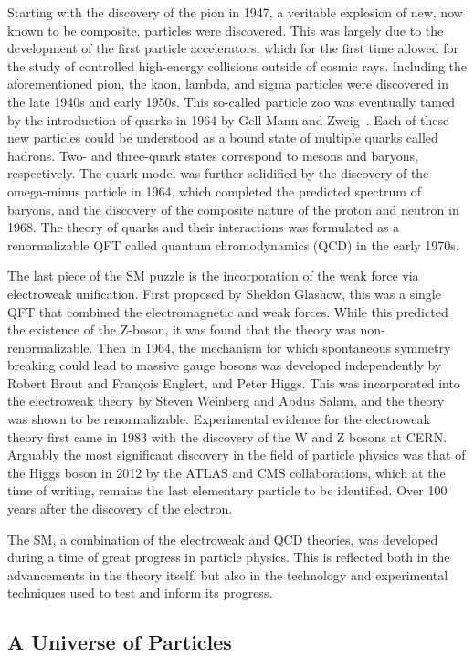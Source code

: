Starting with the discovery of the pion in 1947, a veritable explosion of new, now known to be composite, particles were discovered.
This was largely due to the development of the first particle accelerators, which for the first time allowed for the study of controlled high-energy collisions outside of cosmic rays.
Including the aforementioned pion, the kaon, lambda, and sigma particles were discovered in the late 1940s and early 1950s.
This so-called particle zoo was eventually tamed by the introduction of quarks in 1964 by Gell-Mann and Zweig~\cite{gellmann1964}.
Each of these new particles could be understood as a bound state of multiple quarks called hadrons.
Two- and three-quark states correspond to mesons and baryons, respectively.
The quark model was further solidified by the discovery of the omega-minus particle in 1964, which completed the predicted spectrum of baryons, and the discovery of the composite nature of the proton and neutron in 1968.
The theory of quarks and their interactions was formulated as a renormalizable QFT called quantum chromodynamics (QCD) in the early 1970s.

The last piece of the SM puzzle is the incorporation of the weak force via electroweak unification.
First proposed by Sheldon Glashow, this was a single QFT that combined the electromagnetic and weak forces.
While this predicted the existence of the Z-boson, it was found that the theory was non-renormalizable.
Then in 1964, the mechanism for which spontaneous symmetry breaking could lead to massive gauge bosons was developed independently by Robert Brout and François Englert, and Peter Higgs.
This was incorporated into the electroweak theory by Steven Weinberg and Abdus Salam, and the theory was shown to be renormalizable.
Experimental evidence for the electroweak theory first came in 1983 with the discovery of the W and Z bosons at CERN.
Arguably the most significant discovery in the field of particle physics was that of the Higgs boson in 2012 by the ATLAS and CMS collaborations, which at the time of writing, remains the last elementary particle to be identified.
Over 100 years after the discovery of the electron.

The SM, a combination of the electroweak and QCD theories, was developed during a time of great progress in particle physics.
This is reflected both in the advancements in the theory itself, but also in the technology and experimental techniques used to test and inform its progress.

\subsection{A Universe of Particles}

